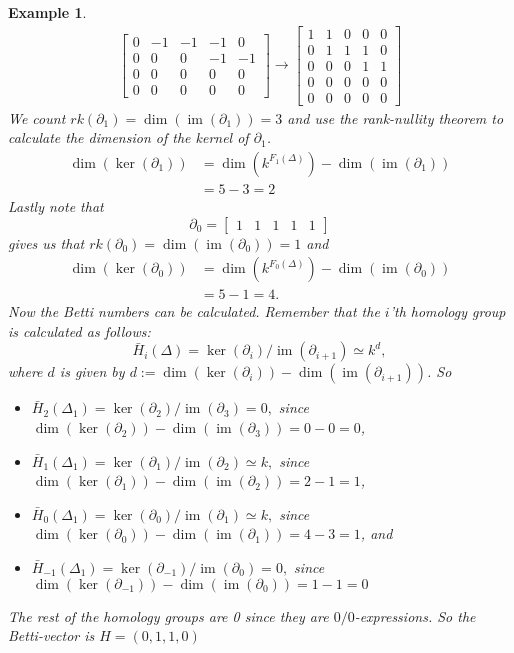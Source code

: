 \documentclass[11pt,a4paper,twoside]{report}
\newtheorem{myex}[mythm]{Example}
\DeclareMathOperator{\im}{im}
\begin{document}
\begin{myex}
\begin{align*}
\begin{bmatrix}
0 & -1 & -1 & -1 & 0\\
0 & 0 & 0 & -1 & -1\\
0 & 0 & 0 & 0 & 0\\
0 & 0 & 0 & 0 & 0
\end{bmatrix}
\to
\begin{bmatrix}
1 & 1 & 0 & 0 & 0\\
0 & 1 & 1 & 1 & 0\\
0 & 0 & 0 & 1 & 1\\
0 & 0 & 0 & 0 & 0\\
0 & 0 & 0 & 0 & 0
\end{bmatrix}
\end{align*}
We count $rk(\partial_1)=\dim(\im(\partial_1))=3$ and use the rank-nullity theorem to calculate the dimension of the kernel of $\partial_1$.
\begin{align*}
\dim(\ker(\partial_1))&=\dim(k^{F_1(\Delta)})-\dim(\im(\partial_1))\\
&=5-3= 2
\end{align*}
Lastly note that 
\begin{equation*}
\partial_0=
\begin{bmatrix}
1 & 1 & 1 & 1 & 1 
\end{bmatrix}
\end{equation*}
gives us that $rk(\partial_0)=\dim(\im(\partial_0))=1$ and 
\begin{align*}
\dim(\ker(\partial_0))&=\dim(k^{F_0(\Delta)})-\dim(\im(\partial_0))\\
&=5-1= 4.
\end{align*}
Now the Betti numbers can be calculated. Remember that the $i$'th homology group is calculated as follows:
\begin{equation*}
\bar{H}_i(\Delta)=\ker(\partial_i)/\im (\partial_{i+1})\simeq k^d,
\end{equation*}
where $d$ is given by $d:=\dim(\ker(\partial_i))-\dim(\im(\partial_{i+1}))$. So 
\begin{itemize}
\item$\bar{H}_2(\Delta_1)=\ker(\partial_2)/\im(\partial_{3})=0,$
since $\dim(\ker(\partial_2))-\dim(\im(\partial_{3}))=0-0=0$,
\item$\bar{H}_1(\Delta_1)=\ker(\partial_1)/\im(\partial_{2})\simeq k,$ since $\dim(\ker(\partial_1))-\dim(\im(\partial_{2}))=2-1=1$,
\item$\bar{H}_0(\Delta_1)=\ker(\partial_0)/\im(\partial_{1})\simeq k,$
since $\dim(\ker(\partial_0))-\dim(\im(\partial_{1}))=4-3=1$, and 
\item$\bar{H}_{-1}(\Delta_1)=\ker(\partial_{-1})/\im(\partial_{0})=0,$
since $\dim(\ker(\partial_{-1}))-\dim(\im(\partial_{0}))=1-1=0$
\end{itemize}
The rest of the homology groups are 0 since they are $0/0$-expressions.
So the Betti-vector is $H=(0,1,1,0)$
\end{myex}
\end{document}

